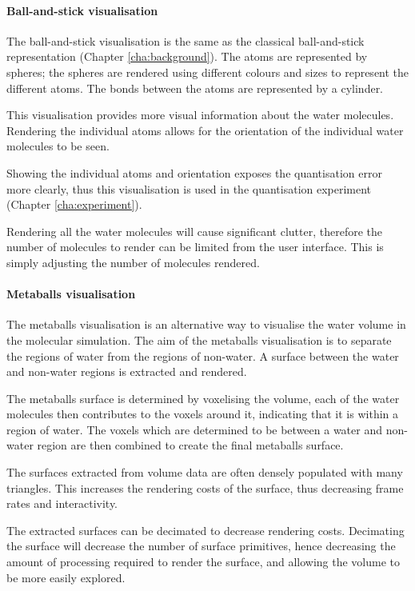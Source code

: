 
\paragraph{Ball-and-stick visualisation}

The ball-and-stick visualisation is the same as the classical ball-and-stick
representation (Chapter \ref{cha:background}). The atoms are represented by
spheres; the spheres are rendered using different colours and sizes to
represent the different atoms. The bonds between the atoms are represented by a
cylinder.

This visualisation provides more visual information about the water molecules.
Rendering the individual atoms allows for the orientation of the individual
water molecules to be seen.

Showing the individual atoms and orientation exposes the quantisation error
more clearly, thus this visualisation is used in the quantisation experiment
(Chapter \ref{cha:experiment}).

Rendering all the water molecules will cause significant clutter, therefore the
number of molecules to render can be limited from the user interface. This is
simply adjusting the number of molecules rendered.


\paragraph{Metaballs visualisation}

The metaballs visualisation is an alternative way to visualise the water volume
in the molecular simulation. The aim of the metaballs visualisation is to
separate the regions of water from the regions of non-water. A surface between
the water and non-water regions is extracted and rendered.

The metaballs surface is determined by voxelising the volume, each of the water
molecules then contributes to the voxels around it, indicating that it is
within a region of water. The voxels which are determined to be between a water
and non-water region are then combined to create the final metaballs surface.

The surfaces extracted from volume data are often densely populated with many
triangles. This increases the rendering costs of the surface, thus decreasing
frame rates and interactivity.

The extracted surfaces can be decimated to decrease rendering costs. Decimating
the surface will decrease the number of surface primitives, hence decreasing
the amount of processing required to render the surface, and allowing the
volume to be more easily explored.

